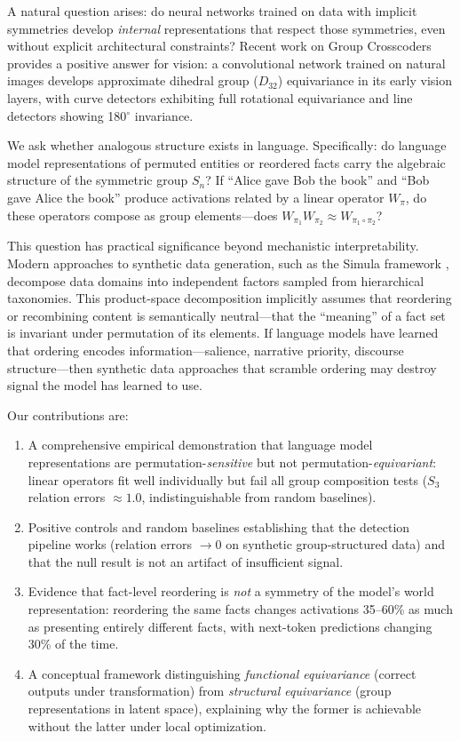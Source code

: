 \documentclass[10pt, letterpaper]{article}
\begin{document}
A natural question arises: do neural networks trained on data with implicit symmetries develop \emph{internal} representations that respect those symmetries, even without explicit architectural constraints? Recent work on Group Crosscoders \cite{bhaskar2024group} provides a positive answer for vision: a convolutional network trained on natural images develops approximate dihedral group ($D_{32}$) equivariance in its early vision layers, with curve detectors exhibiting full rotational equivariance and line detectors showing 180$^\circ$ invariance.

We ask whether analogous structure exists in language. Specifically: do language model representations of permuted entities or reordered facts carry the algebraic structure of the symmetric group $S_n$? If ``Alice gave Bob the book'' and ``Bob gave Alice the book'' produce activations related by a linear operator $W_\pi$, do these operators compose as group elements---does $W_{\pi_1} W_{\pi_2} \approx W_{\pi_1 \circ \pi_2}$?

This question has practical significance beyond mechanistic interpretability. Modern approaches to synthetic data generation, such as the Simula framework \cite{davidson2026simula}, decompose data domains into independent factors sampled from hierarchical taxonomies. This product-space decomposition implicitly assumes that reordering or recombining content is semantically neutral---that the ``meaning'' of a fact set is invariant under permutation of its elements. If language models have learned that ordering encodes information---salience, narrative priority, discourse structure---then synthetic data approaches that scramble ordering may destroy signal the model has learned to use.

Our contributions are:
\begin{enumerate}[itemsep=2pt]
    \item A comprehensive empirical demonstration that language model representations are permutation-\emph{sensitive} but not permutation-\emph{equivariant}: linear operators fit well individually but fail all group composition tests ($S_3$ relation errors $\approx 1.0$, indistinguishable from random baselines).
    \item Positive controls and random baselines establishing that the detection pipeline works (relation errors $\to 0$ on synthetic group-structured data) and that the null result is not an artifact of insufficient signal.
    \item Evidence that fact-level reordering is \emph{not} a symmetry of the model's world representation: reordering the same facts changes activations 35--60\% as much as presenting entirely different facts, with next-token predictions changing 30\% of the time.
    \item A conceptual framework distinguishing \emph{functional equivariance} (correct outputs under transformation) from \emph{structural equivariance} (group representations in latent space), explaining why the former is achievable without the latter under local optimization.
\end{enumerate}
\end{document}
